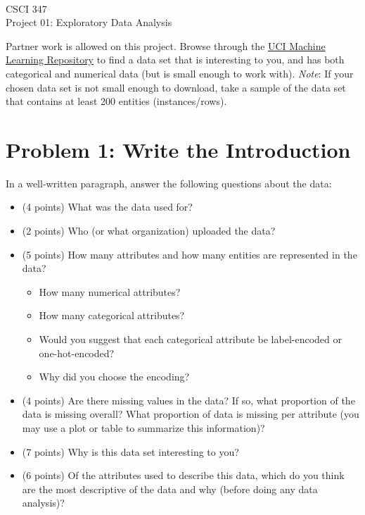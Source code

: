 \documentclass[11pt]{article}
\newcommand{\course}{CSCI 347}
\newcommand{\proj}{Project 01: Exploratory Data Analysis}
\begin{document}
{ ~\\
    \course \\ 
    \proj \\ 
}

Partner work is allowed on this project. Browse through the
\href{https://archive.ics.uci.edu/ml/index.php}{UCI Machine Learning Repository}
to find a data set that is interesting to you, and has both categorical and
numerical data (but is small enough to work with). \textit{Note}: If your chosen
data set is not small enough to download, take a sample of the data set that
contains at least 200 entities (instances/rows).

\section*{Problem 1: Write the Introduction}

In a well-written paragraph, answer the following questions about the data:

\begin{itemize}

    \item (4 points) What was the data used for?

    \item (2 points) Who (or what organization) uploaded the data?

    \item (5 points) How many attributes and how many entities are represented
    in the data?

    \begin{itemize}
        \item How many numerical attributes?
        \item How many categorical attributes?
        \item Would you suggest that each categorical attribute be label-encoded
        or one-hot-encoded?
        \item Why did you choose the encoding?
    \end{itemize}

    \item (4 points) Are there missing values in the data? If so, what
    proportion of the data is missing overall? What proportion of data is
    missing per attribute (you may use a plot or table to summarize this
    information)?

    \item (7 points) Why is this data set interesting to you?

    \item (6 points) Of the attributes used to describe this data, which do you
    think are the most descriptive of the data and why (before doing any data
    analysis)?

\end{itemize}
\end{document}
